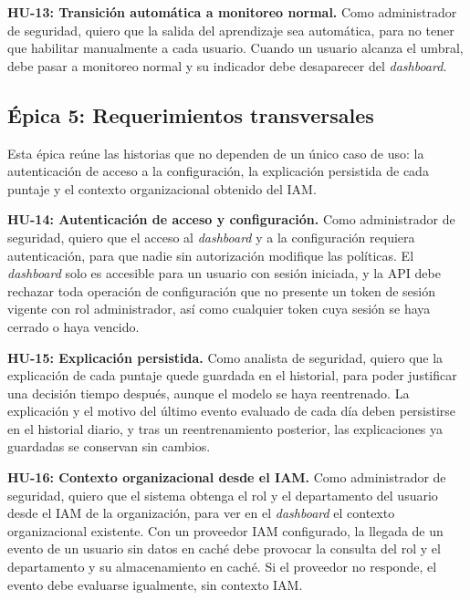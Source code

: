 \textbf{HU-13: Transición automática a monitoreo normal.} Como administrador de seguridad, quiero que la salida del aprendizaje sea automática, para no tener que habilitar manualmente a cada usuario. Cuando un usuario alcanza el umbral, debe pasar a monitoreo normal y su indicador debe desaparecer del \emph{dashboard}.

\subsection{Épica 5: Requerimientos transversales}

Esta épica reúne las historias que no dependen de un único caso de uso: la autenticación de acceso a la configuración, la explicación persistida de cada puntaje y el contexto organizacional obtenido del IAM.

\textbf{HU-14: Autenticación de acceso y configuración.} Como administrador de seguridad, quiero que el acceso al \emph{dashboard} y a la configuración requiera autenticación, para que nadie sin autorización modifique las políticas. El \emph{dashboard} solo es accesible para un usuario con sesión iniciada, y la API debe rechazar toda operación de configuración que no presente un token de sesión vigente con rol administrador, así como cualquier token cuya sesión se haya cerrado o haya vencido.

\textbf{HU-15: Explicación persistida.} Como analista de seguridad, quiero que la explicación de cada puntaje quede guardada en el historial, para poder justificar una decisión tiempo después, aunque el modelo se haya reentrenado. La explicación y el motivo del último evento evaluado de cada día deben persistirse en el historial diario, y tras un reentrenamiento posterior, las explicaciones ya guardadas se conservan sin cambios.

\textbf{HU-16: Contexto organizacional desde el IAM.} Como administrador de seguridad, quiero que el sistema obtenga el rol y el departamento del usuario desde el IAM de la organización, para ver en el \emph{dashboard} el contexto organizacional existente. Con un proveedor IAM configurado, la llegada de un evento de un usuario sin datos en caché debe provocar la consulta del rol y el departamento y su almacenamiento en caché. Si el proveedor no responde, el evento debe evaluarse igualmente, sin contexto IAM.